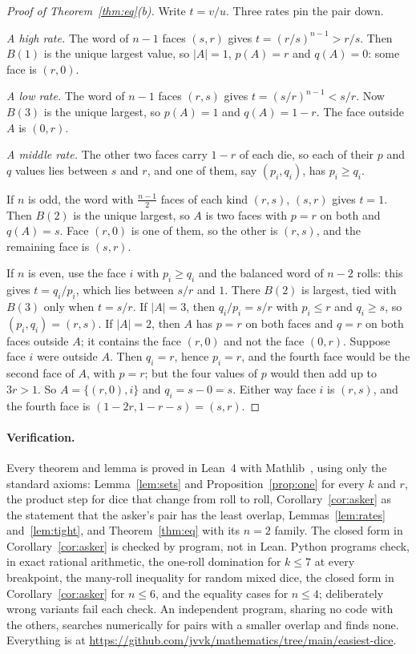 \documentclass[11pt]{article}
\theoremstyle{remark}
\begin{document}
\begin{proof}[Proof of Theorem~\ref{thm:eq}(b)]
Write $t=v/u$. Three rates pin the pair down.

\emph{A high rate.} The word of $n-1$ faces $(s,r)$ gives $t=(r/s)^{n-1}>r/s$. Then $B(1)$ is the unique
largest value, so $|A|=1$, $p(A)=r$ and $q(A)=0$: some face is $(r,0)$.

\emph{A low rate.} The word of $n-1$ faces $(r,s)$ gives $t=(s/r)^{n-1}<s/r$. Now $B(3)$ is the unique largest,
so $p(A)=1$ and $q(A)=1-r$. The face outside $A$ is $(0,r)$.

\emph{A middle rate.} The other two faces carry $1-r$ of each die, so each of their $p$ and $q$ values lies
between $s$ and $r$, and one of them, say $(p_i,q_i)$, has $p_i\ge q_i$.

If $n$ is odd, the word with $\frac{n-1}2$ faces of each kind $(r,s)$, $(s,r)$ gives $t=1$. Then $B(2)$ is the
unique largest, so $A$ is two faces with $p=r$ on both and $q(A)=s$. Face $(r,0)$ is one of them, so the
other is $(r,s)$, and the remaining face is $(s,r)$.

If $n$ is even, use the face $i$ with $p_i\ge q_i$ and the balanced word of $n-2$ rolls: this gives
$t=q_i/p_i$, which lies between $s/r$ and $1$. There $B(2)$ is largest, tied with $B(3)$ only when
$t=s/r$. If $|A|=3$, then $q_i/p_i=s/r$ with $p_i\le r$ and $q_i\ge s$, so $(p_i,q_i)=(r,s)$. If $|A|=2$, then
$A$ has $p=r$ on both faces and $q=r$ on both faces outside $A$; it contains the face $(r,0)$ and not the face
$(0,r)$. Suppose face $i$ were outside $A$. Then $q_i=r$, hence $p_i=r$, and the fourth face would be the
second face of $A$, with $p=r$; but the four values of $p$ would then add up to $3r>1$. So
$A=\{(r,0),i\}$ and $q_i=s-0=s$. Either way face $i$ is $(r,s)$, and the fourth face is $(1-2r,1-r-s)=(s,r)$.
\end{proof}

\paragraph{Verification.} Every theorem and lemma is proved in Lean~4 with Mathlib~\cite{mathlib}, using only
the standard axioms: Lemma~\ref{lem:sets} and Proposition~\ref{prop:one} for every $k$ and $r$, the product step
for dice that change from roll to roll, Corollary~\ref{cor:asker} as the statement that the asker's pair has the
least overlap, Lemmas~\ref{lem:rates} and~\ref{lem:tight}, and Theorem~\ref{thm:eq} with its $n=2$ family. The
closed form in Corollary~\ref{cor:asker} is checked by program, not in Lean. Python programs check, in exact rational arithmetic, the
one-roll domination for $k\le7$ at every breakpoint, the many-roll inequality for random mixed dice, the
closed form in Corollary~\ref{cor:asker} for $n\le6$, and the equality cases for $n\le4$; deliberately wrong
variants fail each check. An independent program, sharing no code with the others, searches numerically for
pairs with a smaller overlap and finds none. Everything is at
\url{https://github.com/jvvk/mathematics/tree/main/easiest-dice}.
\end{document}
